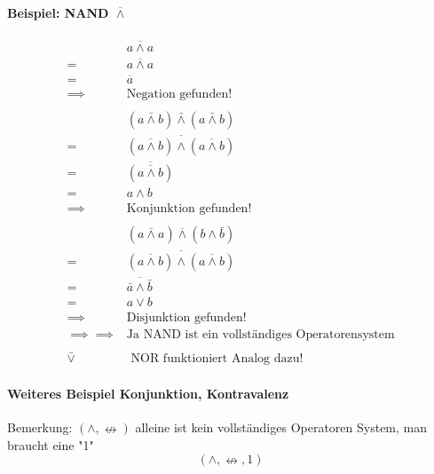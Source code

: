 \documentclass[a4paper]{scrartcl}
\begin{document}
				 \paragraph{Beispiel: NAND \(\overline{\wedge} \)}
				 \begin{align*}
				 	&a \overline{\wedge} a \\
				 	=& \overline{a \wedge a}\\
				 	=& \overline{a}\\
				 	 \implies & \text{Negation gefunden!}\\
				 	\\ 
				 	&(a \bar{\wedge} b) \bar{\wedge} (a \bar{\wedge} b) \\
				 	=& \overline{ (\overline{a \wedge b}) \wedge (\overline{ a \wedge b }) }\\
				 	=& \overline{(\overline{a \wedge b})}\\
				 	=& a \wedge b\\
				 	 \implies & \text{Konjunktion gefunden!}\\
				 	\\
				 	&(a \bar{\wedge} a) \overline{\wedge} ( b \wedge \bar{b} ) \\
				 	=& \overline{ (\overline{a \wedge b}) \wedge (\overline{ a \wedge b }) } \\
				 	=& \overline{ \bar{a} \wedge \bar{b} }\\
				 	=& a \vee b\\
				 	 \implies & \text{Disjunktion gefunden!}\\
				 	\implies \implies & \text{Ja NAND ist ein vollständiges Operatorensystem}\\
				 	\\
				 	\bar{\vee}& \text{ NOR funktioniert Analog dazu!}
				 \end{align*}
				 
				 \paragraph{Weiteres Beispiel Konjunktion, Kontravalenz}
				 Bemerkung: \( (\wedge, \nleftrightarrow) \) alleine ist kein vollständiges Operatoren System, man braucht eine "1"  \[ (\wedge , \nleftrightarrow , 1) \]
				 
\end{document}
